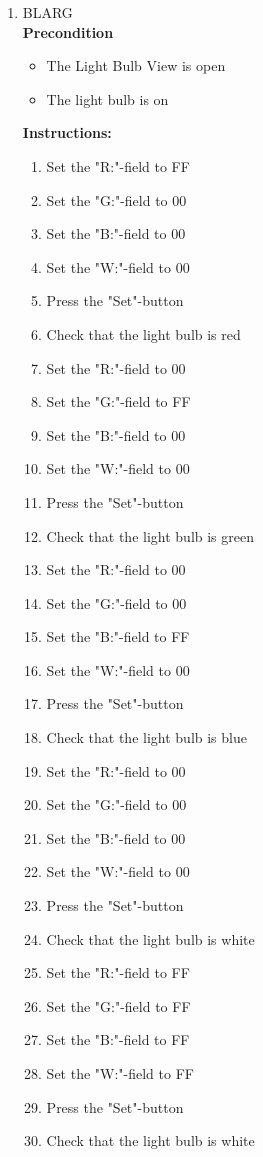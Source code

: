 \documentclass[a4paper]{article}
\newlength{\testlabellength}
\newenvironment{testlist}{\begin{enumerate}[label=\bfseries Instruction \thesubsection.\arabic* , labelindent=0pt, labelwidth=\testlabellength , leftmargin=2cm]}{\end{enumerate}}
\newenvironment{precondition}{
{\color{white}BLARG}\\ 
\textbf{Precondition}
\begin{itemize}[labelindent=0cm, labelwidth=2cm , leftmargin=1cm]
}
{\end{itemize}}
\newenvironment{instruction}{
\textbf{Instructions:}
\begin{enumerate}[label=\bfseries  \arabic*., labelindent=0cm, labelwidth=2cm , leftmargin=1cm]
}
{\end{enumerate}}
\begin{document}
\begin{appendices}
\begin{testlist}
	\item
		\begin{precondition}
			\item The Light Bulb View is open
			\item The light bulb is on
		\end{precondition}
		\begin{instruction}
			\item Set the "R:"-field to FF
			\item Set the "G:"-field to 00
			\item Set the "B:"-field to 00
			\item Set the "W:"-field to 00
			\item Press the "Set"-button
			\item Check that the light bulb is red
			\item Set the "R:"-field to 00
			\item Set the "G:"-field to FF
			\item Set the "B:"-field to 00
			\item Set the "W:"-field to 00
			\item Press the "Set"-button
			\item Check that the light bulb is green
			\item Set the "R:"-field to 00
			\item Set the "G:"-field to 00
			\item Set the "B:"-field to FF
			\item Set the "W:"-field to 00
			\item Press the "Set"-button
			\item Check that the light bulb is blue
			\item Set the "R:"-field to 00
			\item Set the "G:"-field to 00
			\item Set the "B:"-field to 00
			\item Set the "W:"-field to 00
			\item Press the "Set"-button
			\item Check that the light bulb is white
			\item Set the "R:"-field to FF
			\item Set the "G:"-field to FF
			\item Set the "B:"-field to FF
			\item Set the "W:"-field to FF
			\item Press the "Set"-button
			\item Check that the light bulb is white
		\end{instruction}



\end{testlist}
\end{appendices}
\end{document}
